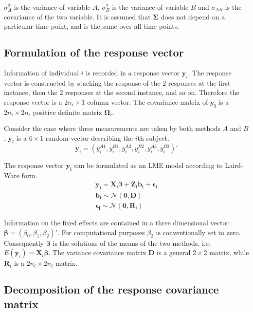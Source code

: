 \documentclass[12pt, a4paper]{report}
\theoremstyle{plain}
\theoremstyle{definition}
\theoremstyle{remark}
\begin{document}
$\sigma^2_{A}$ is the variance of variable $A$, $\sigma^2_{B}$ is the variance of variable $B$ and $\sigma_{AB}$ is the covariance of the two variable. It is assumed that $\boldsymbol{\Sigma}$ does not depend on a particular time point, and is the same over all time points.

\subsection{Formulation of the response vector}
 Information of individual $i$ is recorded in a response vector $\boldsymbol{y}_{i}$. The response vector is constructed by stacking the response of the $2$ responses at the first instance, then the $2$ responses at the second instance, and so on. Therefore the response vector is a $2n_{i} \times 1$ column vector.
The covariance matrix of $\boldsymbol{y_{i}}$ is a $2n_{i} \times 2n_{i}$ positive definite matrix $\boldsymbol{\Omega}_{i}$.

Consider the case where three measurements are taken by both methods $A$ and $B$, $\boldsymbol{y}_{i}$ is a $6 \times 1$ random vector describing the $i$th subject.
\[
\boldsymbol{y}_{i} = (y_{i}^{A1},y_{i}^{B1},y_{i}^{A2},y_{i}^{B2},y_{i}^{A3},y_{i}^{B3}) \prime
\]

The response vector $\boldsymbol{y_{i}}$ can be formulated as an LME model according to Laird-Ware form.
\begin{eqnarray*}
\boldsymbol{y_{i}} = \boldsymbol{X_{i}\beta}  + \boldsymbol{Z_{i}b_{i}} + \boldsymbol{\epsilon_{i}}\\
\boldsymbol{b_{i}} \sim \mathcal{N}(\boldsymbol{0,D})\\
\boldsymbol{\epsilon_{i}} \sim \mathcal{N}(\boldsymbol{0,R_{i}})
\end{eqnarray*}

Information on the fixed effects are contained in a three dimensional vector $\boldsymbol{\beta} = (\beta_{0},\beta_{1},\beta_{2})\prime$. For computational purposes $\beta_{2}$ is conventionally set to zero. Consequently $\boldsymbol{\beta}$ is the solutions of the means of the two methods, i.e. $E(\boldsymbol{y}_{i})  = \boldsymbol{X}_{i}\boldsymbol{\beta}$. The variance covariance matrix $\boldsymbol{D}$ is a general $2 \times 2$ matrix, while $\boldsymbol{R}_{i}$ is a $2n_{i} \times 2n_{i}$ matrix.

\subsection{Decomposition of the response covariance matrix}
\end{document}
